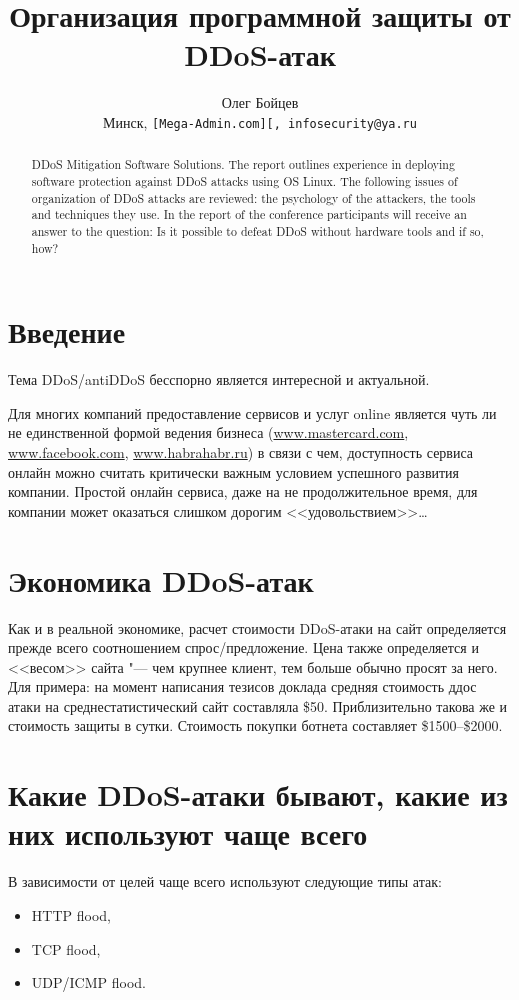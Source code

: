 \documentclass[10pt, a5paper]{article}
\begin{document}
\title{Организация программной защиты от DDoS-атак }

\author{Олег Бойцев\\
\small Минск, \texttt{[Mega-Admin.com][, infosecurity@ya.ru}
}
\maketitle

\begin{abstract}
DDoS Mitigation Software Solutions. The report outlines experience in deploying software protection against DDoS attacks using OS Linux. The following  issues of organization of DDoS attacks are reviewed: the psychology of the attackers, the tools and techniques they use. In the report of the conference participants will receive an answer to the question: Is it possible to defeat DDoS without hardware tools and if so, how?
\end{abstract}

\section*{Введение}
Тема DDoS/antiDDoS бесспорно является интересной и актуальной. 

Для многих компаний предоставление сервисов и услуг  online является чуть ли не единственной формой ведения бизнеса (\url{www.mastercard.com}, \url{www.facebook.com}, \url{www.habrahabr.ru}) в связи с чем, доступность сервиса онлайн можно считать критически важным условием успешного развития компании. Простой онлайн сервиса, даже на не продолжительное время, для компании может оказаться слишком дорогим <<удовольствием>>\ldots

\section*{Экономика DDoS-атак}
Как и в реальной экономике, расчет стоимости DDoS-атаки на сайт определяется прежде всего соотношением спрос/предложение. Цена также определяется и <<весом>> сайта "--- чем крупнее клиент, тем больше обычно просят за него.
Для примера: на момент написания тезисов доклада средняя стоимость ддос атаки на среднестатистический сайт составляла \$50. Приблизительно такова же и стоимость защиты в сутки. Стоимость покупки ботнета составляет \$1500--\$2000.

\section*{Какие DDoS-атаки бывают, какие из них используют чаще всего}
В зависимости от целей  чаще всего используют следующие типы атак:  
\begin{itemize}
\item HTTP flood,
\item TCP flood,
\item UDP/ICMP flood.
\end{itemize}
\end{document}
